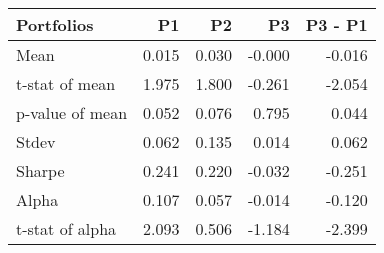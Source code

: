 \begin{tabular}{lrrrr}
\toprule
Portfolios & P1 & P2 & P3 & P3 - P1 \\
\midrule
Mean & 0.015 & 0.030 & -0.000 & -0.016 \\
t-stat of mean & 1.975 & 1.800 & -0.261 & -2.054 \\
p-value of mean & 0.052 & 0.076 & 0.795 & 0.044 \\
Stdev & 0.062 & 0.135 & 0.014 & 0.062 \\
Sharpe & 0.241 & 0.220 & -0.032 & -0.251 \\
Alpha & 0.107 & 0.057 & -0.014 & -0.120 \\
t-stat of alpha & 2.093 & 0.506 & -1.184 & -2.399 \\
\bottomrule
\end{tabular}
